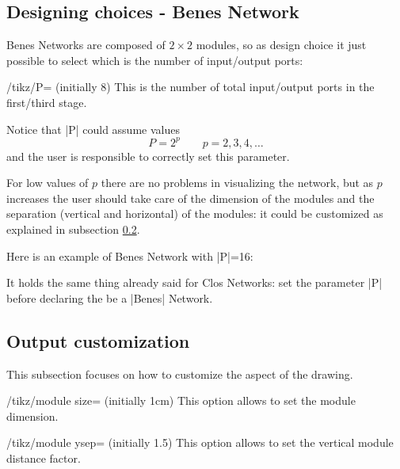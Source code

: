 \documentclass{ltxdoc} %
\begin{document}
\begin{codeexample}[]
\begin{tikzpicture}
    \node[clos rear,N=9,r1=3,M=9,r3=3] {};
\end{tikzpicture}
\end{codeexample}

\subsection{Designing choices - Benes Network}
Benes Networks are composed of $2 \times 2$ modules, so as design choice it just possible to select which is the number of input/output ports:
\begin{key}{/tikz/P= (initially 8)}
    This is the number of total input/output ports in the first/third stage.
\end{key}

Notice that |P| could assume values
\[P=2^p \qquad p=2,3,4,\ldots\]
and the user is responsible to correctly set this parameter.

For low values of $p$ there are no problems in visualizing the network, but as $p$ increases the user should take care of the dimension of the modules and the separation (vertical and horizontal) of the modules: it could be customized as explained in subsection \ref{subsec:customization}.

Here is an example of Benes Network with |P|=16:
\begin{codeexample}[]
\begin{tikzpicture}
    \node[P=16,benes] {};
\end{tikzpicture}
\end{codeexample}

It holds the same thing already said for Clos Networks: set the parameter |P| before declaring the  be a |Benes| Network.


\subsection{Output customization}
\label{subsec:customization}
This subsection focuses on how to customize the aspect of the drawing.

\begin{key}{/tikz/module size= (initially 1cm)}
    This option allows to set the module dimension.
\end{key}

\begin{key}{/tikz/module ysep= (initially 1.5)}
    This option allows to set the vertical module distance factor.
\end{key}
\end{document}
